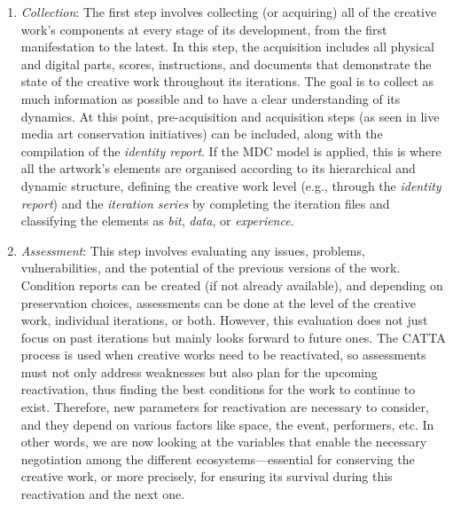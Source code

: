 \begin{enumerate}
    \item \textit{Collection}: The first step involves collecting (or acquiring) all of the creative work's components at every stage of its development, from the first manifestation to the latest. In this step, the acquisition includes all physical and digital parts, scores, instructions, and documents that demonstrate the state of the creative work throughout its iterations. The goal is to collect as much information as possible and to have a clear understanding of its dynamics. At this point, pre-acquisition and acquisition steps (as seen in live media art conservation initiatives) can be included, along with the compilation of the \textit{identity report}. If the MDC model is applied, this is where all the artwork’s elements are organised according to its hierarchical and dynamic structure, defining the creative work level (e.g., through the \textit{identity report}) and the \textit{iteration series} by completing the iteration files and classifying the elements as \textit{bit}, \textit{data}, or \textit{experience}.
    \item \textit{Assessment}: This step involves evaluating any issues, problems, vulnerabilities, and the potential of the previous versions of the work. Condition reports can be created (if not already available), and depending on preservation choices, assessments can be done at the level of the creative work, individual iterations, or both. However, this evaluation does not just focus on past iterations but mainly looks forward to future ones. The CATTA process is used when creative works need to be reactivated, so assessments must not only address weaknesses but also plan for the upcoming reactivation, thus finding the best conditions for the work to continue to exist. Therefore, new parameters for reactivation are necessary to consider, and they depend on various factors like space, the event, performers, etc. In other words, we are now looking at the variables that enable the necessary negotiation among the different ecosystems—essential for conserving the creative work, or more precisely, for ensuring its survival during this reactivation and the next one.\\

\end{enumerate}

